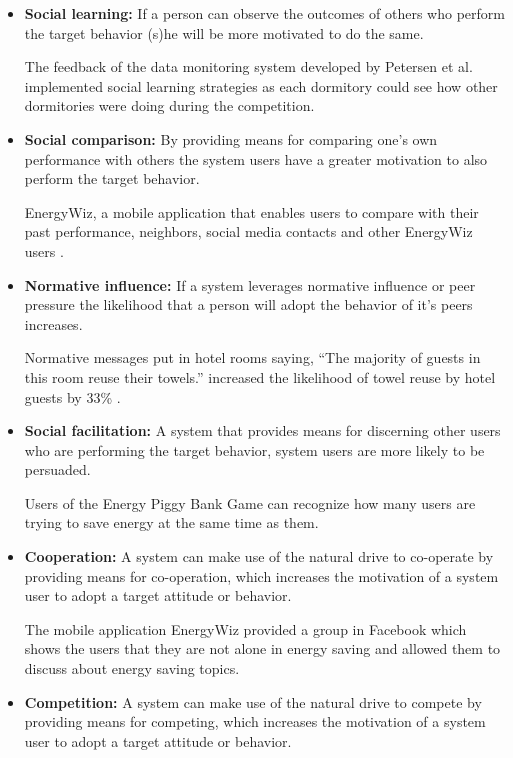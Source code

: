\begin{itemize}
	\item \textbf{Social learning:}
	If a person can observe the outcomes of others who perform the target behavior (s)he will be more motivated to do the same.
	
	The feedback of the data monitoring system developed by Petersen et al. \cite{petersen2007dormitory} implemented social learning strategies as each dormitory could see how other dormitories were doing during the competition.
	
	\item \textbf{Social comparison:}
	By providing means for comparing one's own performance with others the system users have a greater motivation to also perform the target behavior.
	
	EnergyWiz, a mobile application that enables users to compare with their past performance, neighbors, social media contacts and other EnergyWiz users \cite{petkov2011motivating}.
	
	\item \textbf{Normative influence:}
	If a system leverages normative influence or peer pressure the likelihood that a person will adopt the behavior of it's peers increases.

	Normative messages put in hotel rooms saying, “The majority of guests in this room reuse their towels.” increased the likelihood of towel reuse by hotel guests by 33\% \cite{goldstein2008room}.
	
	\item \textbf{Social facilitation:}
	A system that provides means for discerning other users who are performing the target behavior, system users are more likely to be persuaded.
		
	Users of the Energy Piggy Bank Game \cite{Bjorn1165339} can	recognize how many users are trying to save energy at the same time as them.
		
	\item \textbf{Cooperation:}
	A system can make use of the natural drive to co-operate by providing means for co-operation, which increases the motivation of a system user to adopt a target attitude or behavior.
		
	The mobile application EnergyWiz \cite{petkov2011motivating} provided a group in Facebook which shows the users that they are not alone in energy saving and allowed them to discuss about energy saving topics.
	
	\item \textbf{Competition:}
	A system can make use of the natural drive to compete by providing means for competing, which increases the motivation of a system user to adopt a target attitude or behavior.
	

\end{itemize}
